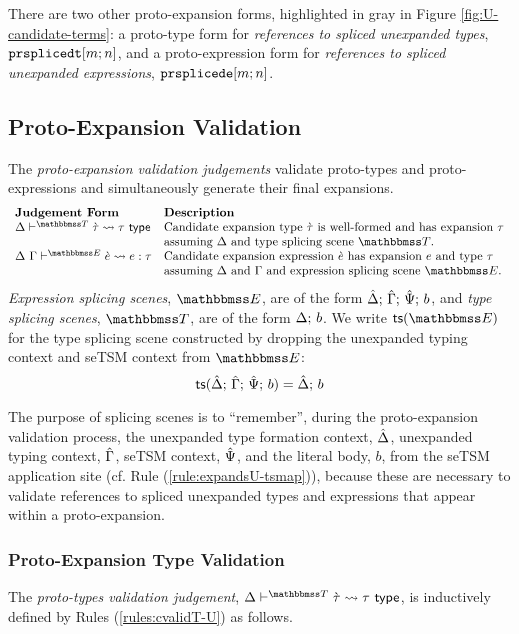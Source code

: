 There are two other proto-expansion forms, highlighted in gray in Figure \ref{fig:U-candidate-terms}: a proto-type form for \emph{references to spliced unexpanded types}, $\texttt{prsplicedt}[m; n]$, and a proto-expression form for \emph{references to spliced unexpanded expressions}, $\texttt{prsplicede}[m; n]$. %

\subsection{Proto-Expansion Validation}\label{sec:ce-validation-U}



The \emph{proto-expansion validation judgements} validate proto-types and proto-expressions and simultaneously generate their final expansions.%
\[\begin{array}{ll}
\textbf{Judgement Form} & \textbf{Description}\\
\cvalidT{\Delta}{\tscenev}{\ctau}{\tau} & \text{Candidate expansion type $\ctau$ is well-formed and has expansion $\tau$}\\
& \text{assuming $\Delta$ and type splicing scene $\tscenev$.}\\
\cvalidE{\Delta}{\Gamma}{\escenev}{\ce}{e}{\tau} & \text{Candidate expansion expression $\ce$ has expansion $e$ and type $\tau$}\\
& \text{assuming $\Delta$ and $\Gamma$ and expression splicing scene $\escenev$.}
\end{array}\]
\emph{Expression splicing scenes}, $\escenev$, are of the form $\hat{\Delta};\,\hat{\Gamma};\,\hat{\Psi};\,b$, and \emph{type splicing scenes}, $\tscenev$, are of the form $\Delta;\,b$. We write $\tsfrom{\escenev}$ for the type splicing scene constructed by dropping the unexpanded typing context and seTSM context from $\escenev$:
\[\mathsf{ts}(\hat{\Delta};\,\hat{\Gamma};\,\hat{\Psi};\,b) = \hat{\Delta};\,b\]

The purpose of splicing scenes is to ``remember'', during the proto-expansion validation process, the unexpanded type formation context, $\hat{\Delta}$, unexpanded typing context, $\hat{\Gamma}$, seTSM context, $\hat{\Psi}$, and the literal body, $b$, from the seTSM application site (cf. Rule (\ref{rule:expandsU-tsmap})), because these are necessary to validate references to spliced unexpanded types and expressions that appear within a proto-expansion.

\subsubsection{Proto-Expansion Type Validation}
The \emph{proto-types validation judgement}, $\cvalidT{\Delta}{\tscenev}{\ctau}{\tau}$, is inductively defined by Rules (\ref*{rules:cvalidT-U}) as follows.

